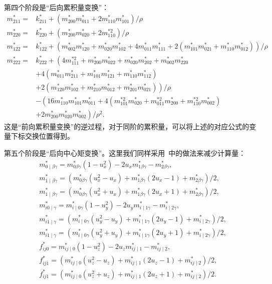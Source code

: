 第四个阶段是“后向累积量变换”：
\begin{align*}
m_{211}^{*}= & k_{211}^{*}+\left(m_{200}^{*} m_{011}^{*}+2 m_{110}^{*} m_{101}^{*}\right) / \rho \\
m_{220}^{*}= & k_{220}^{*}+\left(m_{200}^{*} m_{020}^{*}+2 m_{110}^{* 2}\right) / \rho \\
m_{122}^{*}= & k_{122}^{*}+\left(m_{002}^{*} m_{120}^{*}+m_{020}^{*} m_{102}^{*}+4 m_{011}^{*} m_{111}^{*}+2\left(m_{101}^{*} m_{021}^{*}+m_{110}^{*} m_{012}^{*}\right)\right) / \rho \\
m_{222}^{*}= & k_{222}^{*}+\left(4 m_{111}^{* 2}+m_{200}^{*} m_{022}^{*}+m_{020}^{*} m_{202}^{*}+m_{002}^{*} m_{220}^{*}\right. \\
& +4\left(m_{011}^{*} m_{211}^{*}+m_{101}^{*} m_{121}^{*}+m_{110}^{*} m_{112}^{*}\right) \\
& \left.+2\left(m_{120}^{*} m_{102}^{*}+m_{210}^{*} m_{012}^{*}+m_{201}^{*} m_{021}^{*}\right)\right) / \rho \\
& -\left(16 m_{110}^{*} m_{101}^{*} m_{011}^{*}+4\left(m_{101}^{* 2} m_{020}^{*}+m_{011}^{* 2} m_{200}^{*}+m_{110}^{* 2} m_{002}^{*}\right)\right. \\
& \left.+2 m_{200}^{*} m_{020}^{*} m_{002}^{*}\right) / \rho^{2} .
\end{align*}
这是“前向累积量变换”的逆过程，对于同阶的累积量，可以将上述的对应公式的变量下标交换位置得到。

第五个阶段是“后向中心矩变换”。这里我们同样采用~\cite{Geier-2015}中的做法来减少计算量：
\begin{align*}
    & m_{0 \mid \beta \gamma}^{*}=m_{0 \beta \gamma}^{*}\left(1-u_x^{2}\right)-2u_x m_{1 \beta \gamma}^{*}-m_{2 \beta \gamma}^{*}, \\
    & m_{\overline{1} \mid \beta \gamma}^{*}=\left(m_{0 \beta \gamma}^{*}\left(u_x^{2}-u_x\right)+m_{1 \beta \gamma}^{*}(2 u_x-1)+m_{2 \beta \gamma}^{*}\right) / 2, \\
    & m_{1 \mid \beta \gamma}^{*}=\left(m_{0 \beta \gamma}^{*}\left(u_x^{2}+u_x\right)+m_{1 \beta \gamma}^{*}(2 u_x+1)+m_{2 \beta \gamma}^{*}\right) / 2, \\
    & m_{i 0 \mid \gamma}^{*}=m_{i \mid 0 \gamma}^{*}\left(1-u_y^{2}\right)-2u_y m_{i \mid 1 \gamma}^{*}-m_{i \mid 2 \gamma}^{*}, \\
    & m_{i \overline{1} \mid \gamma}^{*}=\left(m_{i \mid 0 \gamma}^{*}\left(u_y^{2}-u_y\right)+m_{i \mid 1 \gamma}^{*}(2 u_y-1)+m_{i \mid 2 \gamma}^{*}\right) / 2, \\
    & m_{i 1 \mid \gamma}^{*}=\left(m_{i \mid 0 \gamma}^{*}\left(u_y^{2}+u_y\right)+m_{i \mid 1 \gamma}^{*}(2 u_y+1)+m_{i \mid 2 \gamma}^{*}\right) / 2, \\
    & f_{i j 0}^{*}=m_{i j \mid 0}^{*}\left(1-u_z^{2}\right)-2u_z m_{i j \mid 1}^{*}-m_{i j \mid 2}^{*}, \\
    & f_{i j \overline{1}}^{*}=\left(m_{i j \mid 0}^{*}\left(u_z^{2}-u_z\right)+m_{i j \mid 1}^{*}(2 u_z-1)+m_{i j \mid 2}^{*}\right) / 2, \\
    & f_{i j 1}^{*}=\left(m_{i j \mid 0}^{*}\left(u_z^{2}+u_z\right)+m_{i j \mid 1}^{*}(2 u_z+1)+m_{i j \mid 2}^{*}\right) / 2 .
\end{align*}
    

